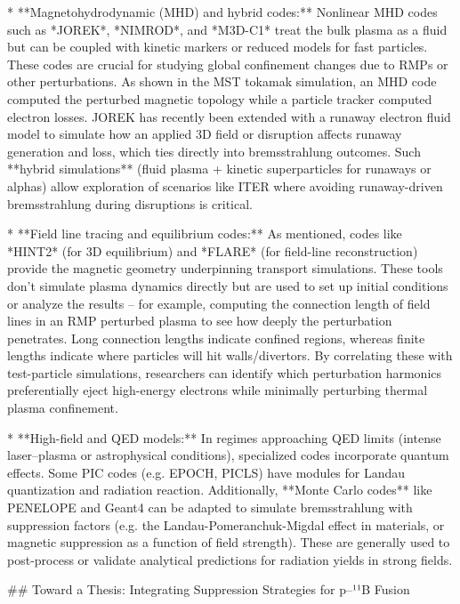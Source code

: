 \documentclass[12pt]{article}
\begin{document}
{* **Magnetohydrodynamic (MHD) and hybrid codes:** Nonlinear MHD codes such as *JOREK*, *NIMROD*, and *M3D-C1* treat the bulk plasma as a fluid but can be coupled with kinetic markers or reduced models for fast particles. These codes are crucial for studying global confinement changes due to RMPs or other perturbations. As shown in the MST tokamak simulation, an MHD code computed the perturbed magnetic topology while a particle tracker computed electron losses. JOREK has recently been extended with a runaway electron fluid model to simulate how an applied 3D field or disruption affects runaway generation and loss, which ties directly into bremsstrahlung outcomes. Such **hybrid simulations** (fluid plasma + kinetic superparticles for runaways or alphas) allow exploration of scenarios like ITER where avoiding runaway-driven bremsstrahlung during disruptions is critical.

* **Field line tracing and equilibrium codes:** As mentioned, codes like *HINT2* (for 3D equilibrium) and *FLARE* (for field-line reconstruction) provide the magnetic geometry underpinning transport simulations. These tools don’t simulate plasma dynamics directly but are used to set up initial conditions or analyze the results – for example, computing the connection length of field lines in an RMP perturbed plasma to see how deeply the perturbation penetrates. Long connection lengths indicate confined regions, whereas finite lengths indicate where particles will hit walls/divertors. By correlating these with test-particle simulations, researchers can identify which perturbation harmonics preferentially eject high-energy electrons while minimally perturbing thermal plasma confinement.

* **High-field and QED models:** In regimes approaching QED limits (intense laser–plasma or astrophysical conditions), specialized codes incorporate quantum effects. Some PIC codes (e.g. EPOCH, PICLS) have modules for Landau quantization and radiation reaction. Additionally, **Monte Carlo codes** like PENELOPE and Geant4 can be adapted to simulate bremsstrahlung with suppression factors (e.g. the Landau-Pomeranchuk-Migdal effect in materials, or magnetic suppression as a function of field strength). These are generally used to post-process or validate analytical predictions for radiation yields in strong fields.

## Toward a Thesis: Integrating Suppression Strategies for p–¹¹B Fusion

}
\end{document}
